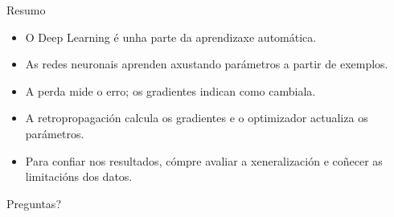 \documentclass[aspectratio=169,10pt]{beamer}
\begin{document}
\begin{frame}{Resumo}
  \begin{itemize}
    \item O Deep Learning é unha parte da aprendizaxe automática.
    \item As redes neuronais aprenden axustando parámetros a partir de exemplos.
    \item A perda mide o erro; os gradientes indican como cambiala.
    \item A retropropagación calcula os gradientes e o optimizador actualiza os parámetros.
    \item Para confiar nos resultados, cómpre avaliar a xeneralización e coñecer as limitacións dos datos.
  \end{itemize}
  \vfill
  \centering
  \Large Preguntas?
\end{frame}
\end{document}
